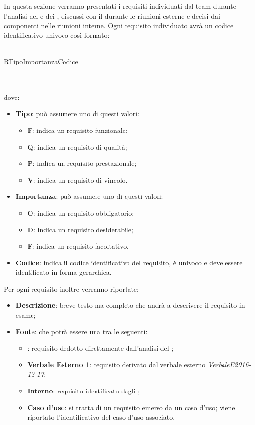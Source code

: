 \documentclass[AdR.tex]{subfiles}
\begin{document}
In questa sezione verranno presentati i requisiti individuati dal team durante l'analisi del 
e dei , discussi con il  durante le riunioni esterne e decisi dai componenti
nelle riunioni interne.
Ogni requisito individuato avrà un codice identificativo univoco così formato: \\ \\
\centerline{R\textbraceleft{}Tipo\textbraceright{}\textbraceleft{}Importanza\textbraceright{}\textbraceleft{}Codice\textbraceright{}}
 \\ \\
dove:
\begin{itemize}
 	\item \textbf{Tipo}: può assumere uno di questi valori:
 	\begin{itemize}
 		\item \textbf{F}: indica un requisito funzionale;
 		\item \textbf{Q}: indica un requisito di qualità;
 		\item \textbf{P}: indica un requisito prestazionale;
 		\item \textbf{V}: indica un requisito di vincolo.
 	\end{itemize}
 	\item \textbf{Importanza}: può assumere uno di questi valori:
 	\begin{itemize}
 		\item \textbf{O}: indica un requisito obbligatorio;
 		\item \textbf{D}: indica un requisito desiderabile;
 		\item \textbf{F}: indica un requisito facoltativo.
 	\end{itemize}
 	\item \textbf{Codice}: indica il codice identificativo del requisito, è univoco e deve essere identificato in forma gerarchica.
 \end{itemize}
Per ogni requisito inoltre verranno riportate:
\begin{itemize}
	\item \textbf{Descrizione}: breve testo ma completo che andrà a descrivere il requisito in esame;
	\item \textbf{Fonte}: che potrà essere una tra le seguenti:
	\begin{itemize}
		\item \textbf{}: requisito dedotto direttamente dall'analisi del ;
		\item \textbf{Verbale Esterno 1}: requisito derivato dal verbale esterno \textit{Verbale\textunderscore{}E\textunderscore{}2016-12-17};
		\item \textbf{Interno}: requisito identificato dagli \ANP;
		\item \textbf{Caso d'uso}: si tratta di un requisito emerso da un caso d'uso; viene riportato l'identificativo del caso d'uso associato.
	\end{itemize}
\end{itemize}
\end{document}
